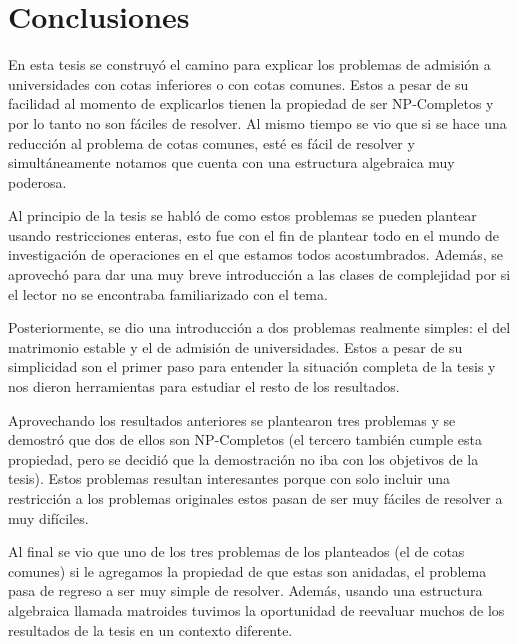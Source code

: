 \chapter{Conclusiones}

En esta tesis se construyó el camino para explicar los problemas de admisión a universidades con cotas inferiores o con cotas comunes. Estos a pesar de su facilidad al momento de explicarlos tienen la propiedad de ser NP-Completos y por lo tanto no son fáciles de resolver. Al mismo tiempo se vio que si se hace una reducción al problema de cotas comunes, esté es fácil de resolver y simultáneamente notamos que cuenta con una estructura algebraica muy poderosa. 

Al principio de la tesis se habló de como estos problemas se pueden plantear usando restricciones enteras, esto fue con el fin de plantear todo en el mundo de investigación de operaciones en el que estamos todos acostumbrados. Además, se aprovechó para dar una muy breve introducción a las clases de complejidad por si el lector no se encontraba familiarizado con el tema. 

Posteriormente, se dio una introducción a dos problemas realmente simples: el del matrimonio estable y el de admisión de universidades. Estos a pesar de su simplicidad son el primer paso para entender la situación completa de la tesis y nos dieron herramientas para estudiar el resto de los resultados. 

Aprovechando los resultados anteriores se plantearon tres problemas y se demostró que dos de ellos son NP-Completos (el tercero también cumple esta propiedad, pero se decidió que la demostración no iba con los objetivos de la tesis). Estos problemas resultan interesantes porque con solo incluir una restricción a los problemas originales estos pasan de ser muy fáciles de resolver a muy difíciles. 

Al final se vio que uno de los tres problemas de los planteados (el de cotas comunes) si le agregamos la propiedad de que estas son anidadas, el problema pasa de regreso a ser muy simple de resolver. Además, usando una estructura algebraica llamada matroides tuvimos la oportunidad de reevaluar muchos de los resultados de la tesis en un contexto diferente. 
